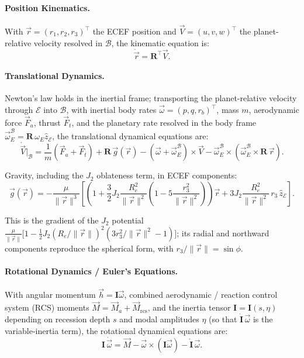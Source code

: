\paragraph{Position Kinematics.}
With $\vec r = (r_1, r_2, r_3)^\top$ the ECEF position and
$\vec V = (u, v, w)^\top$ the planet-relative velocity resolved in
$\mathcal B$, the kinematic equation is:
\begin{equation}
\label{eq:poskin}
\dot{\vec r} = \mathbf R^\top \vec V.
\end{equation}

\paragraph{Translational Dynamics.}
Newton's law holds in the inertial frame; transporting the planet-relative
velocity through $\mathcal E$ into $\mathcal B$, with inertial body rates
$\vec\omega = (p, q, r_b)^\top$, mass $m$, aerodynamic force $\vec F_a$, thrust
$\vec F_t$, and the planetary rate resolved in the body frame
$\vec\omega_E^{\mathcal B} = \mathbf R\,\omega_E\hat z_{\mathcal E}$, the
translational dynamical equations are:
\begin{equation}
\label{eq:transdyn}
\dot{\vec{V}}\big|_{\mathcal{B}} = \frac{1}{m}(\vec{F}_a + \vec{F}_t)
+ \mathbf R\,\vec{g}(\vec r)
- (\vec\omega + \vec\omega_E^{\mathcal B})\times\vec{V}
- \vec\omega_E^{\mathcal B}\times(\vec\omega_E^{\mathcal B}\times\mathbf R\,\vec{r}).
\end{equation}

Gravity, including the $J_2$ oblateness term, in ECEF components:
\begin{equation}
\label{eq:gravity}
\vec g(\vec r) = -\frac{\mu}{\|\vec r\|^3}\left[\left(1
+ \frac{3}{2}J_2\frac{R_e^2}{\|\vec r\|^2}\left(1
- 5\frac{r_3^2}{\|\vec r\|^2}\right)\right)\vec r
+ 3J_2\frac{R_e^2}{\|\vec r\|^2}\,r_3\,\hat z_{\mathcal E}\right].
\end{equation}

\begin{remark}
This is the gradient of the $J_2$ potential
$\frac{\mu}{\|\vec r\|}\bigl[1 - \tfrac12 J_2 (R_e/\|\vec r\|)^2(3 r_3^2/\|\vec r\|^2 - 1)\bigr]$;
its radial and northward components reproduce the spherical form, with
$r_3/\|\vec r\| = \sin\phi$.
\end{remark}

\paragraph{Rotational Dynamics / Euler's Equations.}
With angular momentum $\vec h = \mathbf I\vec\omega$, combined aerodynamic /
reaction control system (RCS) moments
$\vec M = \vec M_a + \vec M_{\mathrm{rcs}}$, and the inertia tensor
$\mathbf I = \mathbf I(s, \eta)$ depending on recession depth $s$ and modal
amplitudes $\eta$ (so that $\dot{\mathbf I}\,\vec\omega$ is the variable-inertia
term), the rotational dynamical equations are:
\begin{equation}
\label{eq:rotdyn}
\mathbf{I}\,\dot{\vec\omega} = \vec{M} - \vec\omega\times(\mathbf{I}\vec\omega)
- \dot{\mathbf{I}}\,\vec\omega.
\end{equation}

